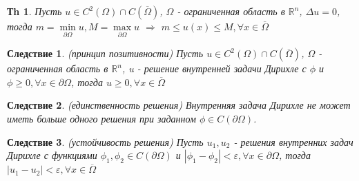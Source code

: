 \documentclass[14pt]{article}
\theoremstyle{plain}
\newtheorem{Thm}{Тh}
\newtheorem{Sled}{Следствие}
\theoremstyle{definition}
\begin{document}
		\begin{Thm}
			Пусть $ u \in C^2(\Omega) \cap C(\overline{\Omega})$, $\Omega$ - ограниченная область в $\mathbb{R}^n$, $\Delta u = 0$, тогда $m = \min\limits_{\partial \Omega} u, M = \max\limits_{\partial \Omega} u $ $\Rightarrow$ $m \leq u(x) \leq M, \forall x \in \overline{\Omega}$
		\end{Thm}
		\begin{Sled}
			(принцип позитивности)\newline
			Пусть $ u \in C^2(\Omega) \cap C(\overline{\Omega})$, $\Omega$ - ограниченная область в $\mathbb{R}^n$, u - решение внутренней задачи Дирихле с $\phi$ и $\phi \geq 0, \forall x \in \partial \Omega$, тогда $u \geq 0, \forall x \in \overline{\Omega}$
		\end{Sled}
		\begin{Sled}
			(единственность решения)\newline
			Внутренняя задача Дирихле не может иметь больше одного решения при заданном $\phi \in C(\partial \Omega)$.
		\end{Sled}
		\begin{Sled}
			(устойчивость решения)\newline
			Пусть $u_1, u_2$ - решения внутренних задач Дирихле с функциями $\phi_1, \phi_2 \in C(\partial \Omega)$ и $| \phi_1 - \phi_2| < \varepsilon, \forall x \in \partial \Omega$, тогда $|u_1 - u_2| < \varepsilon, \forall x \in \overline{\Omega}$
		\end{Sled}
\end{document}
